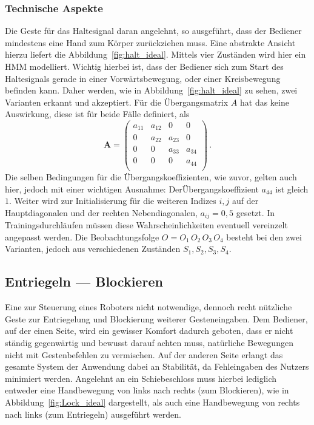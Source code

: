 \subsubsection{Technische Aspekte}
Die Geste f\"ur das Haltesignal daran angelehnt, so ausgef\"uhrt, dass der Bediener mindestens eine Hand zum K\"orper zur\"uckziehen muss. Eine abstrakte Ansicht hierzu liefert die Abbildung~\ref{fig:halt_ideal}. Mittels vier Zust\"anden wird hier ein \acrshort{HMM} modelliert.
\newline
Wichtig hierbei ist, dass der Bediener sich zum Start des Haltesignals gerade in einer Vorw\"artsbewegung, oder einer Kreisbewegung befinden kann. Daher werden, wie in Abbildung~\ref{fig:halt_ideal} zu sehen, zwei Varianten erkannt und akzeptiert. F\"ur die \"Ubergangsmatrix $A$ hat das keine Auswirkung, diese ist f\"ur beide F\"alle definiert, als
\begin{equation}
\mathbf{A} = 
\begin{pmatrix}
a_{11} & a_{12} & 0 & 0\\
0 & a_{22} & a_{23} & 0\\
0 & 0 & a_{33} & a_{34}\\
0 & 0 & 0 & a_{44} \\
\end{pmatrix} \, .
\end{equation}
Die selben Bedingungen f\"ur die \"Ubergangskoeffizienten, wie zuvor, gelten auch hier, jedoch mit einer wichtigen Ausnahme: Der\"Ubergangskoeffizient $a_{44}$ ist gleich $1$. Weiter wird zur Initialisierung f\"ur die weiteren Indizes $i, j$ auf der Hauptdiagonalen und der rechten Nebendiagonalen, $a_{ij} = 0,5$ gesetzt. In Trainingsdurchl\"aufen m\"ussen diese Wahrscheinlichkeiten eventuell vereinzelt angepasst werden. Die Beobachtungsfolge $O = O_1\, O_2\, O_3\, O_4$ besteht bei den zwei Varianten, jedoch aus verschiedenen Zust\"anden $S_1, S_2, S_3, S_4$.

\subsection{Entriegeln --- Blockieren}

Eine zur Steuerung eines Roboters nicht notwendige, dennoch recht n\"utzliche Geste zur Entriegelung und Blockierung weiterer Gesteneingaben. Dem Bediener, auf der einen Seite, wird ein gewisser Komfort dadurch geboten, dass er nicht st\"andig gegenw\"artig und bewusst darauf achten muss, nat\"urliche Bewegungen nicht mit Gestenbefehlen zu vermischen. Auf der anderen Seite erlangt das gesamte System der Anwendung dabei an Stabilit\"at, da Fehleingaben des Nutzers minimiert werden.
\newline
Angelehnt an ein Schiebeschloss muss hierbei lediglich entweder eine Handbewegung von links nach rechts (zum Blockieren), wie in Abbildung~\ref{fig:Lock_ideal} dargestellt, als auch eine Handbewegung von rechts nach links (zum Entriegeln) ausgef\"uhrt werden.

